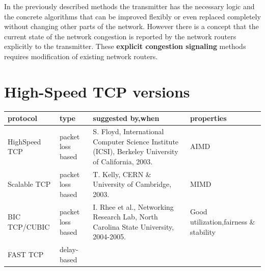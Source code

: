 \documentclass[a4paper]{article}
\begin{document}
In the previously described methods the transmitter has the necessary logic  and the concrete algorithms that can be
improved flexibly or even replaced completely without changing other parts of the network. However there is a concept
that the current state of the network congestion is reported by the network routers explicitly to the transmitter.
These \textbf{explicit congestion signaling} methods requires modification of existing network routers.

\section{High-Speed TCP versions}
\begin{table}
    \begin{tabular}{|p{}|p{}|p{}|p{}|}\hline
        \cellcolor{blue!25}protocol                                                   & \cellcolor{blue!25}type
                                                                                      & \cellcolor{blue!25}suggested
        by,when                                                                       &
        \cellcolor{blue!25}properties
        \\\hline
        \cellcolor{blue!25}HighSpeed TCP                                              & packet loss based
                                                                                      & S. Floyd, International
        Computer Science Institute (ICSI),
        Berkeley University of California, 2003.                                      & AIMD
        \\\hline
        \cellcolor{blue!25}Scalable TCP                                               & packet loss based
                                                                                      & T. Kelly, CERN \& University of
        Cambridge, 2003.                                                              & MIMD
        \\\hline
        \cellcolor{blue!25}BIC TCP/CUBIC                                              & packet loss based
                                                                                      & I. Rhee et al., Networking
        Research Lab, North Carolina State
        University, 2004-2005.                                                        & Good utilization,fairness \&
        stability
        \\\hline
        \cellcolor{blue!25}FAST TCP                                                   & delay-based

\end{tabular}
\end{table}
\end{document}
